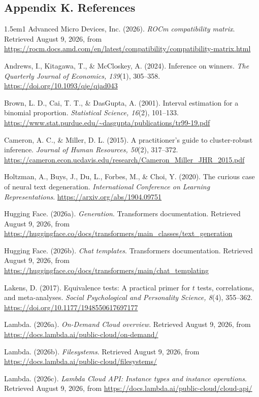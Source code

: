 \documentclass[11pt,a4paper]{article}
\begin{document}
\subsection*{Appendix K. References}
\begin{hangparas}{1.5em}{1}
Advanced Micro Devices, Inc. (2026). \textit{ROCm compatibility matrix}. Retrieved August 9, 2026, from \url{https://rocm.docs.amd.com/en/latest/compatibility/compatibility-matrix.html}

Andrews, I., Kitagawa, T., \& McCloskey, A. (2024). Inference on winners. \textit{The Quarterly Journal of Economics, 139}(1), 305--358. \url{https://doi.org/10.1093/qje/qjad043}

Brown, L. D., Cai, T. T., \& DasGupta, A. (2001). Interval estimation for a binomial proportion. \textit{Statistical Science, 16}(2), 101--133. \url{https://www.stat.purdue.edu/~dasgupta/publications/tr99-19.pdf}

Cameron, A. C., \& Miller, D. L. (2015). A practitioner's guide to cluster-robust inference. \textit{Journal of Human Resources, 50}(2), 317--372. \url{https://cameron.econ.ucdavis.edu/research/Cameron_Miller_JHR_2015.pdf}

Holtzman, A., Buys, J., Du, L., Forbes, M., \& Choi, Y. (2020). The curious case of neural text degeneration. \textit{International Conference on Learning Representations}. \url{https://arxiv.org/abs/1904.09751}

Hugging Face. (2026a). \textit{Generation}. Transformers documentation. Retrieved August 9, 2026, from \url{https://huggingface.co/docs/transformers/main_classes/text_generation}

Hugging Face. (2026b). \textit{Chat templates}. Transformers documentation. Retrieved August 9, 2026, from \url{https://huggingface.co/docs/transformers/main/chat_templating}

Lakens, D. (2017). Equivalence tests: A practical primer for $t$ tests, correlations, and meta-analyses. \textit{Social Psychological and Personality Science, 8}(4), 355--362. \url{https://doi.org/10.1177/1948550617697177}

Lambda. (2026a). \textit{On-Demand Cloud overview}. Retrieved August 9, 2026, from \url{https://docs.lambda.ai/public-cloud/on-demand/}

Lambda. (2026b). \textit{Filesystems}. Retrieved August 9, 2026, from \url{https://docs.lambda.ai/public-cloud/filesystems/}

Lambda. (2026c). \textit{Lambda Cloud API: Instance types and instance operations}. Retrieved August 9, 2026, from \url{https://docs.lambda.ai/public-cloud/cloud-api/}


\end{hangparas}
\end{document}
